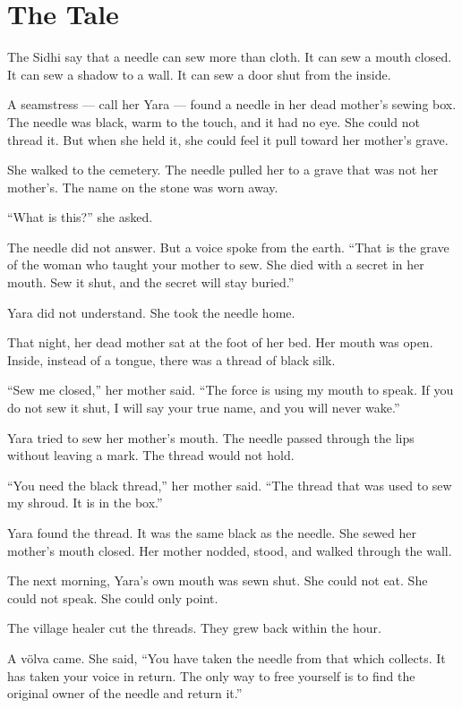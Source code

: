 \documentclass[10pt,twoside]{book}
\begin{document}
\section*{The Tale}
The Sidhi say that a needle can sew more than cloth. It can sew a mouth closed. It can sew a shadow to a wall. It can sew a door shut from the inside.

A seamstress --- call her Yara --- found a needle in her dead mother's sewing box. The needle was black, warm to the touch, and it had no eye. She could not thread it. But when she held it, she could feel it pull toward her mother's grave.

She walked to the cemetery. The needle pulled her to a grave that was not her mother's. The name on the stone was worn away.

``What is this?'' she asked.

The needle did not answer. But a voice spoke from the earth. ``That is the grave of the woman who taught your mother to sew. She died with a secret in her mouth. Sew it shut, and the secret will stay buried.''

Yara did not understand. She took the needle home.

That night, her dead mother sat at the foot of her bed. Her mouth was open. Inside, instead of a tongue, there was a thread of black silk.

``Sew me closed,'' her mother said. ``The force is using my mouth to speak. If you do not sew it shut, I will say your true name, and you will never wake.''

Yara tried to sew her mother's mouth. The needle passed through the lips without leaving a mark. The thread would not hold.

``You need the black thread,'' her mother said. ``The thread that was used to sew my shroud. It is in the box.''

Yara found the thread. It was the same black as the needle. She sewed her mother's mouth closed. Her mother nodded, stood, and walked through the wall.

The next morning, Yara's own mouth was sewn shut. She could not eat. She could not speak. She could only point.

The village healer cut the threads. They grew back within the hour.

A völva came. She said, ``You have taken the needle from that which collects. It has taken your voice in return. The only way to free yourself is to find the original owner of the needle and return it.''
\end{document}
